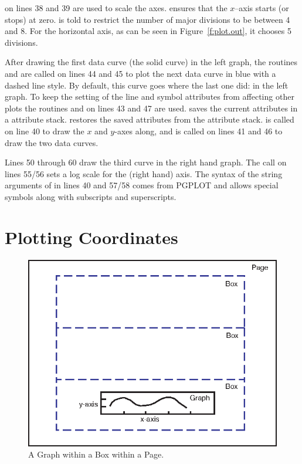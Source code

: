  on lines 38 and 39 are used to scale the
axes.  ensures that the $x$--axis starts (or stops)
at zero.   is told to restrict the number of
major divisions to be between 4 and 8. For the horizontal axis, as can be
seen in Figure~\ref{f:plot.out}, it chooses 5 divisions.

After drawing the first data curve (the solid curve) in the left
graph, the routines  and
 are called on lines 44 and 45 to plot the
next data curve in blue with a dashed line style. By default, this
curve goes where the last one did: in the left graph. To keep the
setting of the line and symbol attributes from affecting other plots
the routines  and  on lines
43 and 47 are used.  saves the current attributes
in a attribute stack.  restores the saved
attributes from the attribute stack.  is called on
line 40 to draw the $x$ and $y$-axes along, and  is called
on lines 41 and 46 to draw the two data curves.

Lines 50 through 60 draw the third curve in the right hand graph.  The
 call on lines 55/56 sets a log scale for the 
(right hand) axis. The syntax of the string arguments of
 in lines 40 and 57/58 comes from PGPLOT and allows
special symbols along with subscripts and superscripts.

\section{Plotting Coordinates}
\label{s:plot.coords}

\begin{figure}
  \centering
  \includegraphics{plot-coords.eps}
  \caption{A Graph within a Box within a Page.}
  \label{f:plot.coords}
\end{figure}

